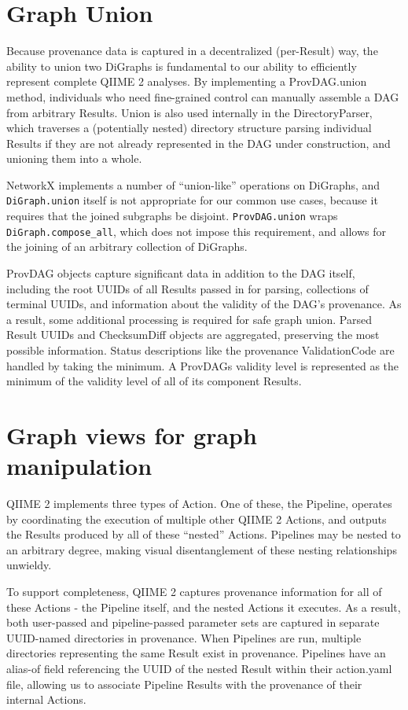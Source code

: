 \section{Graph Union}

Because provenance data is captured in a decentralized (per-Result) way, the
ability to union two DiGraphs is fundamental to our ability to efficiently
represent complete QIIME 2 analyses. By implementing a ProvDAG.union method,
individuals who need fine-grained control can manually assemble a DAG from
arbitrary Results. Union is also used internally in the DirectoryParser, which
traverses a (potentially nested) directory structure parsing individual Results
if they are not already represented in the DAG under construction, and unioning
them into a whole.

NetworkX implements a number of “union-like” operations on DiGraphs, and
\texttt{DiGraph.union} itself is not appropriate for our common use cases, because it
requires that the joined subgraphs be disjoint. \texttt{ProvDAG.union} wraps
\texttt{DiGraph.compose\_all}, which does not impose this requirement, and allows for the
joining of an arbitrary collection of DiGraphs.

ProvDAG objects capture significant data in addition to the DAG itself,
including the root UUIDs of all Results passed in for parsing, collections of
terminal UUIDs, and information about the validity of the DAG’s provenance. As a
result, some additional processing is required for safe graph union. Parsed
Result UUIDs and ChecksumDiff objects are aggregated, preserving the most
possible information. Status descriptions like the provenance ValidationCode are
handled by taking the minimum. A ProvDAGs validity level is represented as the
minimum of the validity level of all of its component Results.


\section{Graph views for graph manipulation}

QIIME 2 implements three types of Action. One of these, the Pipeline, operates
by coordinating the execution of multiple other QIIME 2 Actions, and outputs the
Results produced by all of these “nested” Actions. Pipelines may be nested to an
arbitrary degree, making visual disentanglement of these nesting relationships
unwieldy.

To support completeness, QIIME 2 captures provenance information for all of
these Actions - the Pipeline itself, and the nested Actions it executes. As a
result, both user-passed and pipeline-passed parameter sets are captured in
separate UUID-named directories in provenance. When Pipelines are run, multiple
directories representing the same Result exist in provenance. Pipelines have an
alias-of field referencing the UUID of the nested Result within their
action.yaml file, allowing us to associate Pipeline Results with the provenance
of their internal Actions. 

